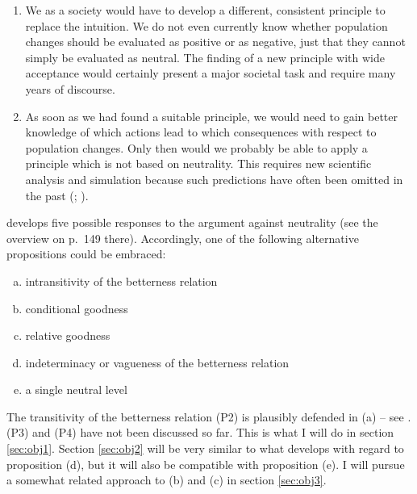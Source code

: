 \begin{enumerate}
\item We as a society would have to develop a different, consistent principle to replace the intuition. We do not even currently know whether population changes should be evaluated as positive or as negative, just that they cannot simply be evaluated as neutral. The finding of a new principle with wide acceptance would certainly present a major societal task and require many years of discourse. 
\item As soon as we had found a suitable principle, we would need to gain better knowledge of which actions lead to which consequences with respect to population changes. Only then would we probably be able to apply a principle which is not based on neutrality. This requires new scientific analysis and simulation because such predictions have often been omitted in the past (; ). 
\end{enumerate}

 develops five possible responses to the argument against neutrality (see the overview on p.~149 there). Accordingly, one of the following alternative propositions could be embraced: 

\begin{enumerate}[(a)]
\item intransitivity of the betterness relation 
\item conditional goodness
\item relative goodness
\item indeterminacy or vagueness of the betterness relation
\item a single neutral level
\end{enumerate}

The transitivity of the betterness relation (P2) is plausibly defended in (a) -- see . 
(P3) and (P4) have not been discussed so far. This is what I will do in section \ref{sec:obj1}. 
Section \ref{sec:obj2} will be very similar to what  develops with regard to proposition (d), but it will also be compatible with proposition (e). 
I will pursue a somewhat related approach to (b) and (c) in section \ref{sec:obj3}.